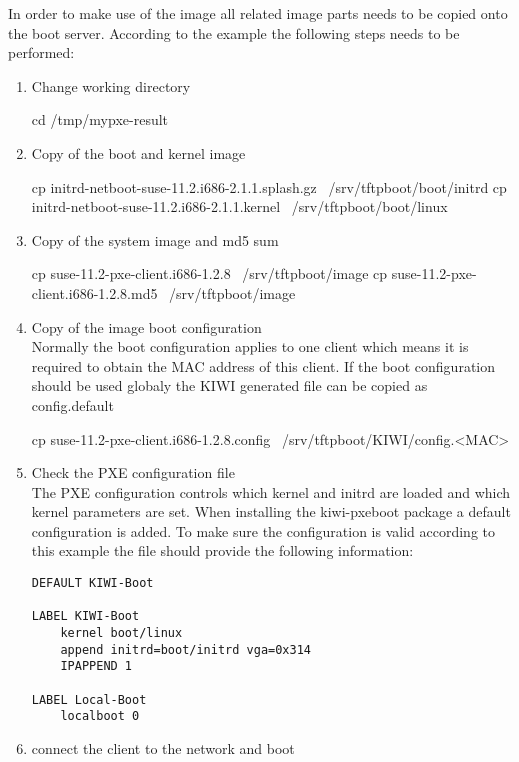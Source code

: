 In order to make use of the image all related image parts needs 
to be copied onto the boot server. According to the example the following
steps needs to be performed:

\begin{enumerate}
\item Change working directory
\begin{Command}
cd /tmp/mypxe-result
\end{Command}
\item Copy of the boot and kernel image
\begin{Command}
cp initrd-netboot-suse-11.2.i686-2.1.1.splash.gz \
   /srv/tftpboot/boot/initrd
cp initrd-netboot-suse-11.2.i686-2.1.1.kernel \
   /srv/tftpboot/boot/linux
\end{Command}
\item Copy of the system image and md5 sum
\begin{Command}
cp suse-11.2-pxe-client.i686-1.2.8 \
   /srv/tftpboot/image
cp suse-11.2-pxe-client.i686-1.2.8.md5 \
   /srv/tftpboot/image
\end{Command}
\item Copy of the image boot configuration\\
      Normally the boot configuration applies to one client which
      means it is required to obtain the MAC address of this client.
      If the boot configuration should be used globaly the KIWI
      generated file can be copied as config.default
\begin{Command}
cp suse-11.2-pxe-client.i686-1.2.8.config \
   /srv/tftpboot/KIWI/config.<MAC>
\end{Command}
\item Check the PXE configuration file\\
      The PXE configuration controls which kernel and initrd are
      loaded and which kernel parameters are set. When installing
      the kiwi-pxeboot package a default configuration is added.
      To make sure the configuration is valid according to this
      example the file  should
      provide the following information:
\begin{verbatim}
DEFAULT KIWI-Boot

LABEL KIWI-Boot
    kernel boot/linux
    append initrd=boot/initrd vga=0x314
    IPAPPEND 1

LABEL Local-Boot
    localboot 0
\end{verbatim}
\item connect the client to the network and boot
\end{enumerate}

